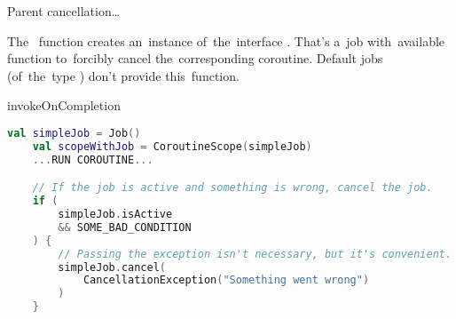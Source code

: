 \warning Parent cancellation\ldots

\note The~ function creates an~instance of~the~interface .
That's a~job with~available function  to~forcibly cancel the~corresponding coroutine.
Default jobs (of~the~type ) don't provide this~function.

\todo invokeOnCompletion

\begin{lstlisting}[language=Kotlin]
    val simpleJob = Job()
    val scopeWithJob = CoroutineScope(simpleJob)
    ...RUN COROUTINE...

    // If the job is active and something is wrong, cancel the job.
    if (
        simpleJob.isActive
        && SOME_BAD_CONDITION
    ) {
        // Passing the exception isn't necessary, but it's convenient.
        simpleJob.cancel(
            CancellationException("Something went wrong")
        )
    }
\end{lstlisting}
